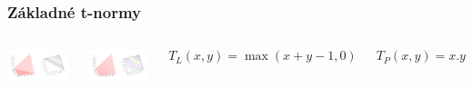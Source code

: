 \documentclass{beamer}
\begin{document}
\begin{frame}
\frametitle{Základné t-normy}
\begin{columns}
\begin{minipage}[c][0.4\textheight][c]{\linewidth}
  \centering
  \includegraphics[width=0.9\linewidth]{LukasiewiczTnorm}
\end{minipage}
\begin{minipage}[c][0.4\textheight][c]{\linewidth}
  \centering
  \includegraphics[width=0.9\linewidth]{ProductTnorm}
\end{minipage}
\begin{minipage}[c][0.4\textheight][c]{\linewidth}
$$ T_L(x,y)=\max(x+y-1,0)$$
\end{minipage}
\begin{minipage}[c][0.4\textheight][c]{\linewidth}
$$ T_P(x,y)=x.y$$
\end{minipage}
\end{columns}
\end{frame}
\end{document}
